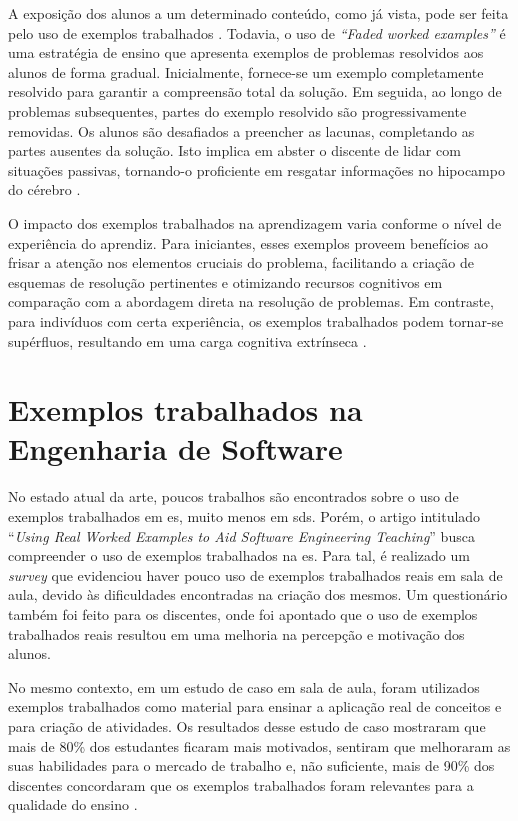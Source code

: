 A exposição dos alunos a um determinado conteúdo, como já vista, pode ser feita pelo uso de exemplos trabalhados \cite{Robert.Atkinson-etal:2000}. Todavia, o uso de \textit{``Faded worked examples''} é uma estratégia de ensino que apresenta exemplos de problemas resolvidos aos alunos de forma gradual. Inicialmente, fornece-se um exemplo completamente resolvido para garantir a compreensão total da solução. Em seguida, ao longo de problemas subsequentes, partes do exemplo resolvido são progressivamente removidas. Os alunos são desafiados a preencher as lacunas, completando as partes ausentes da solução. Isto implica em abster o discente de lidar com situações passivas, tornando-o proficiente em resgatar informações no hipocampo do cérebro \cite{Skudder-LuxtonReilly:2014}.

O impacto dos exemplos trabalhados na aprendizagem varia conforme o nível de experiência do aprendiz. Para iniciantes, esses exemplos proveem benefícios ao frisar a atenção nos elementos cruciais do problema, facilitando a criação de esquemas de resolução pertinentes e otimizando recursos cognitivos em comparação com a abordagem direta na resolução de problemas. Em contraste, para indivíduos com certa experiência, os exemplos trabalhados podem tornar-se supérfluos, resultando em uma carga cognitiva extrínseca \cite{Skudder-LuxtonReilly:2014}.

\section{Exemplos trabalhados na Engenharia de Software}

No estado atual da arte, poucos trabalhos são encontrados sobre o uso de exemplos trabalhados em \gls{es}, muito menos em \gls{sds}. Porém, o artigo intitulado ``\textit{Using Real Worked Examples to Aid Software Engineering Teaching}'' \cite{Simone.Tonhao-etal:2021} busca compreender o uso de exemplos trabalhados na \gls{es}. Para tal, é realizado um \textit{survey} que evidenciou haver pouco uso de exemplos trabalhados reais em sala de aula, devido às dificuldades encontradas na criação dos mesmos. Um questionário também foi feito para os discentes, onde foi apontado que o uso de exemplos trabalhados reais resultou em uma melhoria na percepção e motivação dos alunos.

No mesmo contexto, em um estudo de caso em sala de aula, foram utilizados exemplos trabalhados como material para ensinar a aplicação real de conceitos e para criação de atividades. Os resultados desse estudo de caso mostraram que mais de 80\% dos estudantes ficaram mais motivados, sentiram que melhoraram as suas habilidades para o mercado de trabalho e, não suficiente, mais de 90\% dos discentes concordaram que os exemplos trabalhados foram relevantes para a qualidade do ensino \cite{Simone.Tonhao-etal:2021}.

